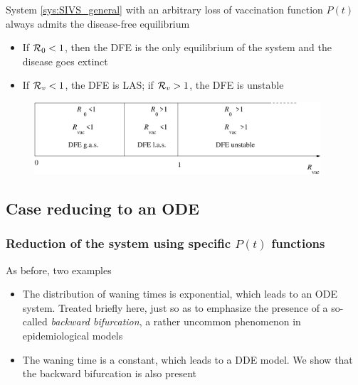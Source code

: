 \documentclass[aspectratio=169]{beamer}\usepackage[]{graphicx}\usepackage[]{xcolor}
\begin{document}
\begin{frame}
\begin{theorem}
System \eqref{sys:SIVS_general} with an arbitrary loss of vaccination function $P(t)$ always admits the disease-free equilibrium
\begin{itemize}
\item
If $\mathcal{R}_0< 1$, then the DFE is the only equilibrium of the system and the disease goes extinct
\item
If $\mathcal{R}_v<1$, the DFE is LAS; if $\mathcal{R}_v>1$, the DFE is unstable
\end{itemize}
\label{th:R0_gen_mod}
\end{theorem}
\vfill
\begin{figure}[htbp]
 \begin{center}
   \includegraphics[width=0.95\textwidth]{FIGS/Rvac}
 \end{center}
\end{figure}
\end{frame}


\subsection{Case reducing to an ODE}

\begin{frame}\frametitle{Reduction of the system using specific $P(t)$ functions}
As before, two examples
\vfill
\begin{itemize}
\item The distribution of waning times is exponential, which leads to
 an ODE system. Treated briefly here, just so as to emphasize the
 presence of a so-called \emph{backward bifurcation}, a rather
 uncommon phenomenon in epidemiological models
\vfill
\item The waning time is a constant, which leads to a DDE model. We
 show that the backward bifurcation is also present
\end{itemize}
\end{frame}
\end{document}
